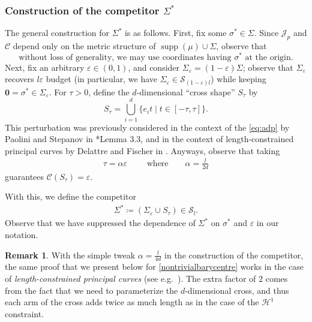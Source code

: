 \documentclass[preprint, reqno]{amsart}
\DeclareMathOperator*{\supp}{supp}
\renewcommand{\epsilon}{\varepsilon}
\theoremstyle{definition}
\newtheorem{remark}[definition]{Remark}
\numberwithin{equation}{section}
\begin{document}
\subsubsection{Construction of the competitor
  $\Sigma^*$} \label{sec:competitor-construction} The general
construction for $\Sigma^*$ is as follows. First, fix some $\sigma^*
\in \Sigma$. Since $\mathscr J_p$ and $\mathscr C$ depend only on the
metric structure of $\supp(\mu) \cup \Sigma$, observe that
\begin{equation}
  \text{without loss of generality, we may use coordinates
    having $\sigma^*$ at the origin.}
  \label{coordinate-translation}
\end{equation}
Next, fix an arbitrary $\epsilon \in (0,1)$, and consider
$\Sigma_{\epsilon} = (1 - \epsilon)\Sigma$; observe that
$\Sigma_\epsilon$ recovers $l\epsilon$ budget (in particular, we have
$\Sigma_\epsilon \in \mathcal{S}_{(1-\epsilon) l}$) while keeping
$\mathbf{0} = \sigma^* \in \Sigma_\epsilon$. For $\tau > 0$, define
the $d$-dimensional ``cross shape'' $S_\tau$ by
\[
  S_{\tau} = \bigcup_{i=1}^d \{e_i t \mid t \in [-\tau, \tau]\}.
\]
This perturbation was previously considered in the context of the
\eqref{eq:adp} by Paolini and Stepanov in \cite{Stepanov04}*{Lemma
  3.3}, and in the context of length-constrained principal curves by
Delattre and Fischer in \cite[Lemma 3.1]{Delattre17}. Anyways, observe
that taking
\begin{align}\label{eqn:tau-alpha}
  \tau = \alpha\epsilon \qquad \text{ where} \qquad \alpha =
  \frac{l}{2d}
\end{align}
guarantees $\mathscr C(S_\tau) = \epsilon$.

With this, we define the competitor
\begin{align}\label{eqn:competitor}
  \Sigma^* \coloneqq
  (\Sigma_{\epsilon}\cup S_{\tau}) \in \mathcal S_l.
\end{align}
Observe that we have suppressed the dependence of $\Sigma^*$ on
$\sigma^*$ and $\epsilon$ in our notation.

\begin{remark}
  With the simple tweak $\alpha = \frac{l}{4d}$ in the construction of
  the competitor, the same proof that we present below for
  \cref{nontrivialbarycentre} works in the case of
  \emph{length-constrained principal curves} (see e.g.\
  \cite{Delattre17}). The extra factor of $2$ comes from the fact that
  we need to parameterize the $d$-dimensional cross, and thus each arm
  of the cross adds twice as much length as in the case of the
  $\mathcal{H}^1$ constraint.
\end{remark}
\end{document}
